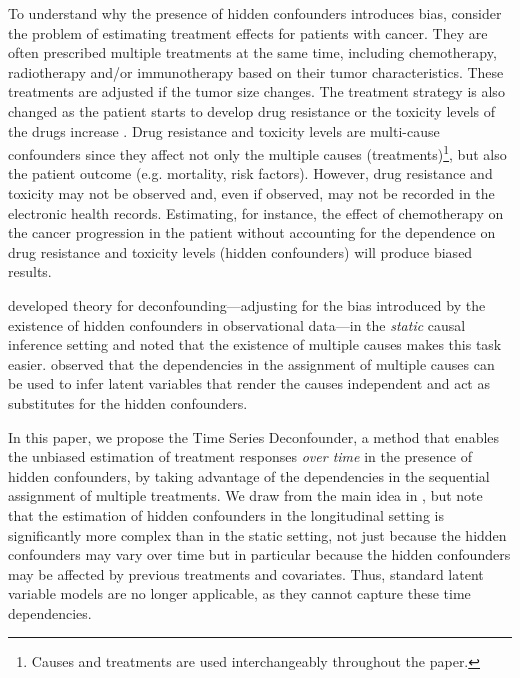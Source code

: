 \documentclass{article}
\begin{document}
	To understand why the presence of hidden confounders introduces bias, consider the problem of estimating treatment effects for patients with cancer. They are often prescribed multiple treatments at the same time, including chemotherapy, radiotherapy and/or immunotherapy based on their tumor characteristics. These treatments are adjusted if the tumor size changes. The treatment strategy is also changed as the patient starts to develop drug resistance \citep{vlachostergios2018treatment} or the toxicity levels of the drugs increase \citep{kroschinsky2017new}. Drug resistance and toxicity levels are multi-cause confounders since they affect not only the multiple causes (treatments)\footnote{Causes and treatments are used interchangeably throughout the paper.}, but also the patient outcome (e.g. mortality, risk factors). However, drug resistance and toxicity may not be observed and, even if observed, may not be recorded in the electronic health records. Estimating, for instance, the effect of chemotherapy on the cancer progression in the patient without accounting for the dependence on drug resistance and toxicity levels (hidden confounders) will produce biased results.  
	
	\citet{wang2018blessings} developed theory for deconfounding---adjusting for the bias introduced by the existence of hidden confounders in observational data---in the \textit{static} causal inference setting and noted that the existence of multiple causes makes this task easier. \citet{wang2018blessings} observed that the dependencies in the assignment of multiple causes can be used to infer latent variables that render the causes independent and act as substitutes for the hidden confounders. 	
	
	In this paper, we propose the Time Series Deconfounder, a method that enables the unbiased estimation of treatment responses \textit{over time} in the presence of hidden confounders, by taking advantage of the  dependencies in the sequential assignment of multiple treatments.  We draw from the main idea in \citet{wang2018blessings}, but note that the estimation of hidden confounders in the longitudinal setting is significantly more complex than in the static setting, not just because the hidden confounders may vary over time but in particular because the hidden confounders may be affected by previous treatments and covariates. Thus, standard latent variable models are no longer applicable, as they cannot capture these time dependencies. 	
	
\end{document}
